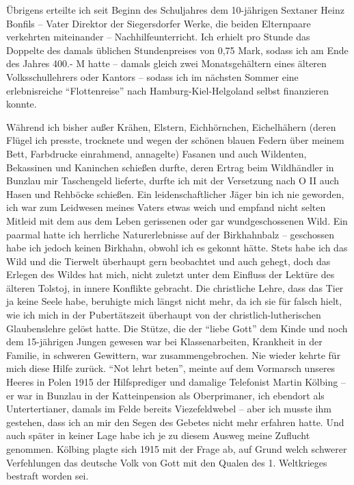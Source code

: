 Übrigens erteilte ich seit Beginn des Schuljahres dem 10-jährigen Sextaner Heinz Bonfils -- Vater Direktor der Siegersdorfer Werke, die beiden Elternpaare verkehrten miteinander -- Nachhilfeunterricht. Ich erhielt pro Stunde das Doppelte des damals üblichen Stundenpreises von 0,75 Mark, sodass ich am Ende des Jahres 400.- M hatte -- damals gleich zwei Monatsgehältern eines älteren Volksschullehrers oder Kantors -- sodass ich im nächsten Sommer eine erlebnisreiche \enquote{Flottenreise} nach Hamburg-Kiel-Helgoland selbst finanzieren konnte.

Während ich bisher außer Krähen, Elstern, Eichhörnchen, Eichelhähern (deren Flügel ich presste, trocknete und wegen der schönen blauen Federn über meinem Bett, Farbdrucke einrahmend, annagelte) Fasanen und auch Wildenten, Bekassinen und Kaninchen schießen durfte, deren Ertrag beim Wildhändler in Bunzlau mir Taschengeld lieferte, durfte ich mit der Versetzung nach O II auch Hasen und Rehböcke schießen. Ein leidenschaftlicher Jäger bin ich nie geworden, ich war zum Leidwesen meines Vaters etwas weich und empfand nicht selten Mitleid mit dem aus dem Leben gerissenen oder gar wundgeschossenen Wild. Ein paarmal hatte ich herrliche Naturerlebnisse auf der Birkhahnbalz -- geschossen habe ich jedoch keinen Birkhahn, obwohl ich es gekonnt hätte. Stets habe ich das Wild und die Tierwelt überhaupt gern beobachtet und auch gehegt, doch das Erlegen des Wildes hat mich, nicht zuletzt unter dem Einfluss der Lektüre des älteren Tolstoj, in innere Konflikte gebracht. Die christliche Lehre, dass das Tier ja keine Seele habe, beruhigte mich längst nicht mehr, da ich sie für falsch hielt, wie ich mich in der Pubertätszeit überhaupt von der christlich-lutherischen Glaubenslehre gelöst hatte. Die Stütze, die der \enquote{liebe Gott} dem Kinde und noch dem 15-jährigen Jungen gewesen war bei Klassenarbeiten, Krankheit in der Familie, in schweren Gewittern, war zusammengebrochen. Nie wieder kehrte für mich diese Hilfe zurück. \enquote{Not lehrt beten}, meinte auf dem Vormarsch unseres Heeres in Polen 1915 der Hilfsprediger und damalige Telefonist Martin Kölbing -- er war in Bunzlau in der Katteinpension als Oberprimaner, ich ebendort als Untertertianer, damals im Felde bereits Viezefeldwebel -- aber ich musste ihm gestehen, dass ich an mir den Segen des Gebetes nicht mehr erfahren hatte. Und auch später in keiner Lage habe ich je zu diesem Ausweg meine Zuflucht genommen. Kölbing plagte sich 1915 mit der Frage ab, auf Grund welch schwerer Verfehlungen das deutsche Volk von Gott mit den Qualen des 1. Weltkrieges bestraft worden sei.

